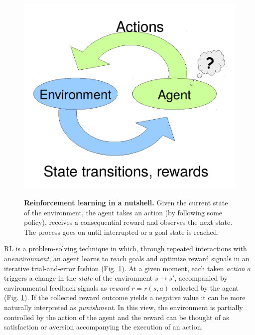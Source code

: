 \documentclass[10pt,letterpaper]{article}
\begin{document}
\begin{figure}
  \caption{\textbf{Reinforcement learning in a nutshell.} Given the current state of the environment,
    the agent takes an action (by following some policy), receives a consequential reward and observes the next state. The process goes on until interrupted or a goal state is reached.}
  \centering
  \includegraphics[width=1.\linewidth]{rl.pdf}
  \label{fig:rl}
\end{figure}


RL is a problem-solving technique in which,
through repeated interactions with an\textit{environment},
an agent learns to reach goals and optimize reward signals
in an iterative trial-and-error fashion (Fig. \ref{fig:rl}).
At a given moment, each taken \textit{action} $a$ triggers a change
in the \textit{state} of the environment
$s \rightarrow s'$, accompanied by environmental feedback signals as \textit{reward}
$r = r(s, a)$ collected by the agent (Fig. \ref{fig:rl}).
If the collected reward outcome yields a negative value it can be
more naturally interpreted as \textit{punishment}.
In this view, the environment is partially controlled by
the action of the agent and the reward can be thought
of as satisfaction \textemdash or aversion \textemdash accompanying the execution of
an action.
\end{document}
